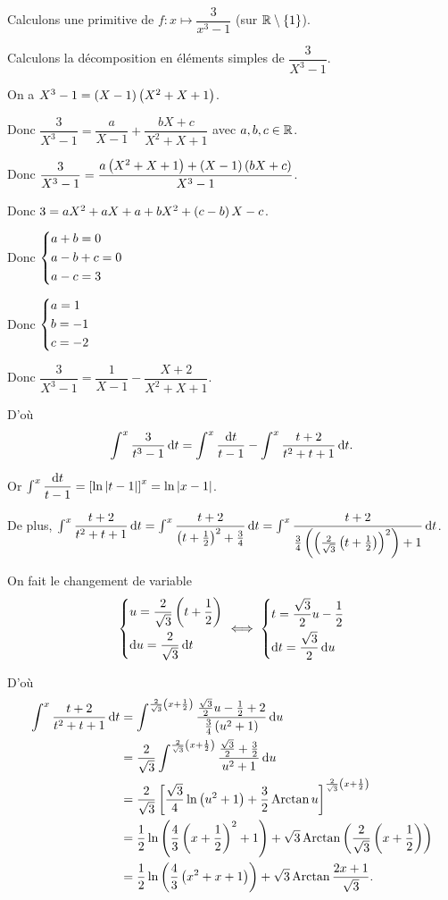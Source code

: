 \begin{ex}
Calculons une primitive de \(f:x\mapsto\dfrac{3}{x^3-1}\) (sur \(\mathbb{R}\setminus\left\lbrace1\right\rbrace\)).

Calculons la décomposition en éléments simples de \(\dfrac{3}{X^3-1}\).

On a \(X^3-1=\left(X-1\right)\left(X^2+X+1\right)\).

Donc \(\dfrac{3}{X^3-1}=\dfrac{a}{X-1}+\dfrac{bX+c}{X^2+X+1}\) avec \(a,b,c\in\mathbb{R}\).

Donc \(\dfrac{3}{X^3-1}=\dfrac{a\left(X^2+X+1\right)+\left(X-1\right)\left(bX+c\right)}{X^3-1}\).

Donc \(3=aX^2+aX+a+bX^2+\left(c-b\right)X-c\).

Donc \(\begin{dcases}a+b=0 \\ a-b+c=0 \\ a-c=3\end{dcases}\)

Donc \(\begin{dcases}a=1 \\ b=-1 \\ c=-2\end{dcases}\)

Donc \(\dfrac{3}{X^3-1}=\dfrac{1}{X-1}-\dfrac{X+2}{X^2+X+1}\).

D'où \[\int^x\dfrac{3}{t^3-1}\odif{t}=\int^x\dfrac{\odif{t}}{t-1}-\int^x\dfrac{t+2}{t^2+t+1}\odif{t}.\]

Or \(\int^x\dfrac{\odif{t}}{t-1}=\croch{\ln\abs{t-1}}^x=\ln\abs{x-1}\).

De plus, \(\int^x\dfrac{t+2}{t^2+t+1}\odif{t}=\int^x\dfrac{t+2}{\paren{t+\frac{1}{2}}^2+\frac{3}{4}}\odif{t}=\int^x\dfrac{t+2}{\frac{3}{4}\paren{\paren{\frac{2}{\sqrt{3}}\paren{t+\frac{1}{2}}}^2}+1}\odif{t}\).

On fait le changement de variable \[\begin{dcases}u=\dfrac{2}{\sqrt{3}}\paren{t+\dfrac{1}{2}} \\ \odif{u}=\dfrac{2}{\sqrt{3}}\odif{t}\end{dcases}\ssi\begin{dcases}t=\dfrac{\sqrt{3}}{2}u-\dfrac{1}{2} \\ \odif{t}=\dfrac{\sqrt{3}}{2}\odif{u}\end{dcases}\]

D'où \[\begin{aligned}
\int^x\dfrac{t+2}{t^2+t+1}\odif{t}&=\int^{\frac{2}{\sqrt{3}}\paren{x+\frac{1}{2}}}\dfrac{\frac{\sqrt{3}}{2}u-\frac{1}{2}+2}{\frac{3}{4}\paren{u^2+1}}\odif{u} \\
&=\dfrac{2}{\sqrt{3}}\int^{\frac{2}{\sqrt{3}}\paren{x+\frac{1}{2}}}\dfrac{\frac{\sqrt{3}}{2}+\frac{3}{2}}{u^2+1}\odif{u} \\
&=\dfrac{2}{\sqrt{3}}\croch{\dfrac{\sqrt{3}}{4}\ln\paren{u^2+1}+\dfrac{3}{2}\Arctan u}^{\frac{2}{\sqrt{3}}\paren{x+\frac{1}{2}}} \\
&=\dfrac{1}{2}\ln\paren{\dfrac{4}{3}\paren{x+\dfrac{1}{2}}^2+1}+\sqrt{3}\Arctan\paren{\dfrac{2}{\sqrt{3}}\paren{x+\dfrac{1}{2}}} \\
&=\dfrac{1}{2}\ln\paren{\dfrac{4}{3}\paren{x^2+x+1}}+\sqrt{3}\Arctan\dfrac{2x+1}{\sqrt{3}}.
\end{aligned}\]


\end{ex}
